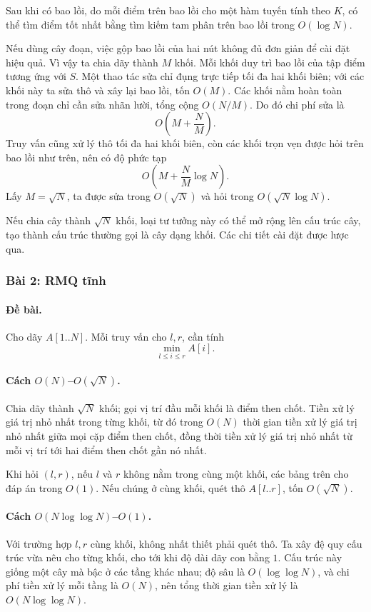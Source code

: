 \documentclass[11pt]{article}
\begin{document}
Sau khi có bao lồi, do mỗi điểm trên bao lồi cho một hàm tuyến tính theo \(K\),
có thể tìm điểm tốt nhất bằng tìm kiếm tam phân trên bao lồi trong
\(O(\log N)\).

Nếu dùng cây đoạn, việc gộp bao lồi của hai nút không đủ đơn giản để cài đặt
hiệu quả. Vì vậy ta chia dãy thành \(M\) khối. Mỗi khối duy trì bao lồi của
tập điểm tương ứng với \(S\). Một thao tác sửa chỉ đụng trực tiếp tối đa hai
khối biên; với các khối này ta sửa thô và xây lại bao lồi, tốn \(O(M)\). Các
khối nằm hoàn toàn trong đoạn chỉ cần sửa nhãn lười, tổng cộng
\(O(N/M)\). Do đó chi phí sửa là
\[
  O\left(M+\frac{N}{M}\right).
\]
Truy vấn cũng xử lý thô tối đa hai khối biên, còn các khối trọn vẹn được hỏi
trên bao lồi như trên, nên có độ phức tạp
\[
  O\left(M+\frac{N}{M}\log N\right).
\]
Lấy \(M=\sqrt N\), ta được sửa trong \(O(\sqrt N)\) và hỏi trong
\(O(\sqrt N\log N)\).

Nếu chia cây thành \(\sqrt N\) khối, loại tư tưởng này có thể mở rộng lên cấu
trúc cây, tạo thành cấu trúc thường gọi là cây dạng khối. Các chi tiết cài đặt
được lược qua.

\subsubsection{Bài 2: RMQ tĩnh}

\paragraph{Đề bài.}
Cho dãy \(A[1..N]\). Mỗi truy vấn cho \(l,r\), cần tính
\[
  \min_{l\le i\le r} A[i].
\]

\paragraph{Cách \(O(N)\)--\(O(\sqrt N)\).}
Chia dãy thành \(\sqrt N\) khối; gọi vị trí đầu mỗi khối là điểm then chốt.
Tiền xử lý giá trị nhỏ nhất trong từng khối, từ đó trong \(O(N)\) thời gian
tiền xử lý giá trị nhỏ nhất giữa mọi cặp điểm then chốt, đồng thời tiền xử lý
giá trị nhỏ nhất từ mỗi vị trí tới hai điểm then chốt gần nó nhất.

Khi hỏi \((l,r)\), nếu \(l\) và \(r\) không nằm trong cùng một khối, các bảng
trên cho đáp án trong \(O(1)\). Nếu chúng ở cùng khối, quét thô
\(A[l..r]\), tốn \(O(\sqrt N)\).

\paragraph{Cách \(O(N\log\log N)\)--\(O(1)\).}
Với trường hợp \(l,r\) cùng khối, không nhất thiết phải quét thô. Ta xây đệ
quy cấu trúc vừa nêu cho từng khối, cho tới khi độ dài dãy con bằng \(1\).
Cấu trúc này giống một cây mà bậc ở các tầng khác nhau; độ sâu là
\(O(\log\log N)\), và chi phí tiền xử lý mỗi tầng là \(O(N)\), nên tổng thời
gian tiền xử lý là \(O(N\log\log N)\).
\end{document}
